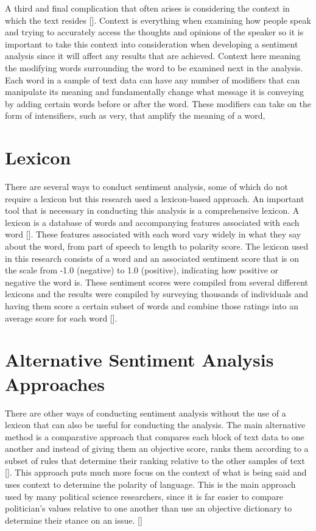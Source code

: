A third and final complication that often arises is considering the context in which the text resides [\cite{aggarwal2012mining}].
Context is everything when examining how people speak and trying to accurately access the thoughts and opinions of the speaker so it is important to take this context into consideration when developing a sentiment analysis since it will affect any results that are achieved.
Context here meaning the modifying words surrounding the word to be examined next in the analysis.
Each word in a sample of text data can have any number of modifiers that can manipulate its meaning and fundamentally change what message it is conveying by adding certain words before or after the word.
These modifiers can take on the form of intensifiers, such as very, that amplify the meaning of a word, 

\section{Lexicon}
There are several ways to conduct sentiment analysis, some of which do not require a lexicon but this research used a lexicon-based approach.
An important tool that is necessary in conducting this analysis is a comprehensive lexicon.
A lexicon is a database of words and accompanying features associated with each word [\cite{taboada2011lexicon}].
These features associated with each word vary widely in what they say about the word, from part of speech to length to polarity score.
The lexicon used in this research consists of a word and an associated sentiment score that is on the scale from -1.0 (negative) to 1.0 (positive), indicating how positive or negative the word is.
These sentiment scores were compiled from several different lexicons and the results were compiled by surveying thousands of individuals and having them score a certain subset of words and combine those ratings into an average score for each word [\cite{somasundaran2010lexicon}].

\section{Alternative Sentiment Analysis Approaches}
There are other ways of conducting sentiment analysis without the use of a lexicon that can also be useful for conducting the analysis.
The main alternative method is a comparative approach that compares each block of text data to one another and instead of giving them an objective score, ranks them according to a subset of rules that determine their ranking relative to the other samples of text [\cite{wilson2005contextual}].
This approach puts much more focus on the context of what is being said and uses context to determine the polarity of language.
This is the main approach used by many political science researchers, since it is far easier to compare politician's values relative to one another than use an objective dictionary to determine their stance on an issue. [\cite{laver2003extracting}]

